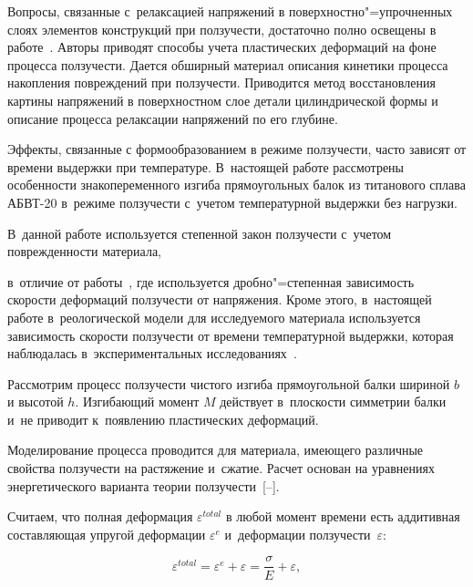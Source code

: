 Вопросы, связанные с~релаксацией напряжений в поверхностно"=упрочненных слоях элементов конструкций при ползучести, достаточно полно освещены в работе~\cite{iya:Radchenko}. Авторы приводят способы учета пластических деформаций на фоне процесса ползучести. Дается обширный материал описания кинетики процесса накопления повреждений при ползучести. Приводится метод восстановления картины напряжений в поверхностном слое детали цилиндрической формы и описание процесса релаксации напряжений по его глубине.



Эффекты, связанные с формообразованием в режиме ползучести, часто зависят от времени выдержки при температуре. В~настоящей работе рассмотрены особенности знакопеременного изгиба прямоугольных балок из титанового сплава АБВТ-20 в~режиме ползучести с~учетом температурной выдержки без нагрузки. 

В~данной работе используется степенной закон ползучести с~учетом поврежденности материала, 

в~отличие от работы~\cite{iya:Loko2012}, где используется дробно"=степенная зависимость скорости деформаций ползучести от напряжения. Кроме этого, в~настоящей работе в~реологической модели для исследуемого материала используется зависимость скорости ползучести от времени температурной выдержки, которая наблюдалась в~экспериментальных исследованиях~\cite{iya:Larichkin}.





\smallskip




Рассмотрим процесс ползучести чистого изгиба прямоугольной балки шириной $b$ и высотой $h$. Изгибающий момент $M$ действует в~плоскости симметрии балки и~не приводит к~появлению пластических деформаций. 

Моделирование процесса проводится для материала, имеющего различные свойства ползучести на растяжение и~сжатие. Расчет основан на уравнениях энергетического варианта теории ползучести~[--].



Считаем, что полная деформация $\varepsilon^{total}$ в любой момент времени есть аддитивная составляющая упругой деформации $\varepsilon^{e}$ и~деформации ползучести~$\varepsilon$:

\begin{equation*}

\varepsilon^{total}=\varepsilon^{e}+\varepsilon=\frac{\sigma}{E} + \varepsilon,

		\end{equation*}

